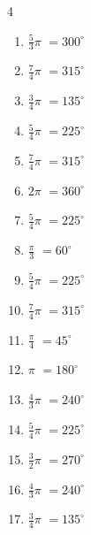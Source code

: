 \begin{multicols}{4}
\begin{enumerate}
\columnbreak %

\resetques

  \item $\displaystyle \frac{5}{3}\pi$
        $\displaystyle =300^{\circ}$

  \item $\displaystyle \frac{7}{4}\pi$
        $\displaystyle =315^{\circ}$

  \item $\displaystyle \frac{3}{4}\pi$
        $\displaystyle =135^{\circ}$

  \item $\displaystyle \frac{5}{4}\pi$
        $\displaystyle =225^{\circ}$

  \item $\displaystyle \frac{7}{4}\pi$
        $\displaystyle =315^{\circ}$

  \item $\displaystyle 2\pi$
        $\displaystyle =360^{\circ}$

  \item $\displaystyle \frac{5}{4}\pi$
        $\displaystyle =225^{\circ}$

  \item $\displaystyle \frac{\pi}{3}$
        $\displaystyle =60^{\circ}$

  \item $\displaystyle \frac{5}{4}\pi$
        $\displaystyle =225^{\circ}$

  \item $\displaystyle \frac{7}{4}\pi$
        $\displaystyle =315^{\circ}$

  \item $\displaystyle \frac{\pi}{4}$
        $\displaystyle =45^{\circ}$

  \item $\displaystyle \pi$
        $\displaystyle =180^{\circ}$

  \item $\displaystyle \frac{4}{3}\pi$
        $\displaystyle =240^{\circ}$

  \item $\displaystyle \frac{5}{4}\pi$
        $\displaystyle =225^{\circ}$

  \item $\displaystyle \frac{3}{2}\pi$
        $\displaystyle =270^{\circ}$

  \item $\displaystyle \frac{4}{3}\pi$
        $\displaystyle =240^{\circ}$

  \item $\displaystyle \frac{3}{4}\pi$
        $\displaystyle =135^{\circ}$


\end{enumerate}
\end{multicols}
